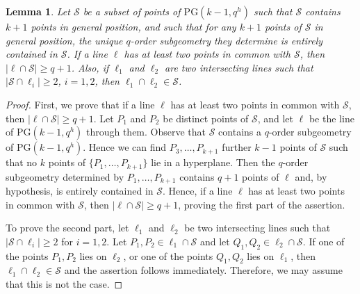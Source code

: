\documentclass[11pt]{article}
\newtheorem{lemma}[theorem]{Lemma}
\theoremstyle{definition}
\numberwithin{equation}{section}
\def\cS{\mathcal S}
\def\PG{\mathrm{PG}}
\begin{document}
\begin{lemma} \label{lemma:retta1}
Let $\cS$ be a subset of points of $\PG(k-1,q^h)$ such that $\cS$ contains $k+1$ points in general position, and such that for any 
$k+1$ points of $\cS$ in general position, the unique $q$-order 
subgeometry they determine is entirely contained in $\cS$. If a line $\ell$ has at least two points in common with $\cS$, then $|\ell \cap \cS| \ge q+1$. Also, if $\ell_1$ and $\ell_2$ are two intersecting lines such that $|\cS \cap \ell_i| \ge 2$, $i = 1,2$, then $\ell_1 \cap \ell_2 \in \cS$. 
\end{lemma}
\begin{proof}
First, we prove that if a line $\ell$ has at least two points in common with 
$\mathcal S$, then $|\ell \cap \mathcal S| \ge q+1$. 
Let $P_1$ and $P_2$ be distinct points of $\mathcal S$, and let $\ell$ be the line 
of $\PG(k-1,q^h)$ through them. Observe that $\cS$ contains a $q$-order subgeometry of $\PG(k-1, q^h)$. Hence we can find  $P_3,\dots,P_{k+1}$ further $k-1$ points 
of $\mathcal S$ such that no $k$ points of $\{P_1,\dots,P_{k+1}\}$ lie in a 
hyperplane. Then the $q$-order subgeometry determined by $P_1,\dots,P_{k+1}$ 
contains $q+1$ points of $\ell$ and, by hypothesis, is entirely contained in 
$\mathcal S$. Hence, if a line $\ell$ has at least two points in common with 
$\mathcal S$, then $|\ell \cap \mathcal S| \ge q+1$, proving the first part of 
the assertion.

\noindent To prove the second part, let $\ell_1$ and $\ell_2$ be two intersecting lines such 
that $|\mathcal S \cap \ell_i| \ge 2$ for $i=1,2$. Let $P_1,P_2 \in \ell_1 \cap 
\mathcal S$ and let $Q_1,Q_2 \in \ell_2 \cap \mathcal S$. If one of the points 
$P_1,P_2$ lies on $\ell_2$, or one of the points $Q_1,Q_2$ lies on $\ell_1$, then 
$\ell_1 \cap \ell_2 \in \mathcal S$ and the assertion follows immediately. 
Therefore, we may assume that this is not the case.


\end{proof}
\end{document}
